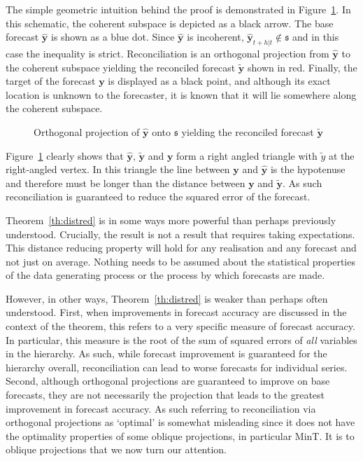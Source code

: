 \documentclass[12pt]{article}
\theoremstyle{definition}
\theoremstyle{property}
\begin{document}
	The simple geometric intuition behind the proof is demonstrated in Figure~\ref{fig:Schematic_OLSRecon}.  In this schematic, the coherent subspace is depicted as a black arrow.  The base forecast $\hat{\bm{y}}$ is shown as a blue dot.  Since $\hat{\bm{y}}$ is incoherent, $\hat{\bm{y}}_{t+h|t}\notin\mathfrak{s}$ and in this case the inequality is strict.  Reconciliation is an orthogonal projection from $\hat{\bm{y}}$ to the coherent subspace yielding the reconciled forecast $\tilde{\bm{y}}$ shown in red.  Finally, the target of the forecast $\bm{y}$ is displayed as a black point, and although its exact location is unknown to the forecaster, it is known that it will lie somewhere along the coherent subspace.
	
	\begin{figure}[H]\label{fig:Schematic_OLSRecon}
		\centering
		\vspace{-0.9cm}
		\tiny
		\resizebox{\linewidth}{!}{}
		\caption{Orthogonal projection of $\hat{\bm{y}}$ onto $\mathfrak{s}$ yielding the reconciled forecast $\tilde{\bm{y}}$}
		
	\end{figure}
	
	
	Figure~\ref{fig:Schematic_OLSRecon} clearly shows that $\hat{\bm{y}}$, $\tilde{\bm{y}}$ and $\bm{y}$ form a right angled triangle with $\tilde{y}$ at the right-angled vertex.  In this triangle the line between $\bm{y}$ and $\hat{\bm{y}}$ is the hypotenuse and therefore must be longer than the distance between $\bm{y}$ and $\tilde{\bm{y}}$.  As such reconciliation is guaranteed to reduce the squared error of the forecast.
	
    Theorem~\ref{th:distred} is in some ways more powerful than perhaps previously understood.  Crucially, the result is not a result that requires taking expectations.  This distance reducing property will hold for any realisation and any forecast and not just on average.  Nothing needs to be assumed about the statistical properties of the data generating process or the process by which forecasts are made. 
    
    However, in other ways, Theorem~\ref{th:distred} is weaker than perhaps often understood. First, when improvements in forecast accuracy are discussed in the context of the theorem, this refers to a very specific measure of forecast accuracy.  In particular, this measure is the root of the sum of squared errors of {\em all} variables in the hierarchy.  As such, while forecast improvement is guaranteed for the hierarchy overall, reconciliation can lead to worse forecasts for individual series. Second, although orthogonal projections are guaranteed to improve on base forecasts, they are not necessarily the projection that leads to the greatest improvement in forecast accuracy.  As such referring to reconciliation via orthogonal projections as `optimal' is somewhat misleading since it does not have the optimality properties of some oblique projections, in particular MinT. It is to oblique projections that we now turn our attention.
    	
\end{document}
